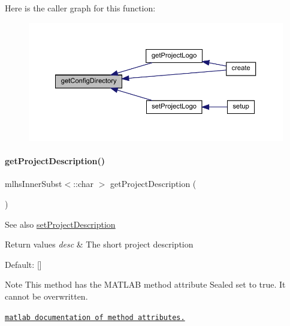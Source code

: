 Here is the caller graph for this function\+:\nopagebreak
\begin{figure}[H]
\begin{center}
\leavevmode
\includegraphics[width=350pt]{class_matlab_doc_maker_ac201c45057310993a26a114403254c41_icgraph}
\end{center}
\end{figure}
\mbox{\label{class_matlab_doc_maker_add46ecca31bbef99fba8ba6dc177e05a}} 
\paragraph{\texorpdfstring{get\+Project\+Description()}{getProjectDescription()}}
{\footnotesize\ttfamily mlhs\+Inner\+Subst$<$\+::char $>$ get\+Project\+Description (\begin{DoxyParamCaption}{ }\end{DoxyParamCaption})\hspace{0.3cm}{\ttfamily [static]}}

\begin{DoxySeeAlso}{See also}
\hyperlink{class_matlab_doc_maker_aa36d079ff377b0de42dd58c0154abc0d}{set\+Project\+Description}
\end{DoxySeeAlso}

\begin{DoxyRetVals}{Return values}
{\em desc} & The short project description \\
\hline
\end{DoxyRetVals}
\begin{DoxyParagraph}{Default\+:}
\mbox{[}\mbox{]}
\end{DoxyParagraph}
\begin{DoxyNote}{Note}
This method has the M\+A\+T\+L\+AB method attribute {\ttfamily Sealed} set to true. It cannot be overwritten. 

\href{http://www.mathworks.com/help/matlab/matlab_oop/method-attributes.html}{\tt matlab documentation of method attributes.} 
\end{DoxyNote}


